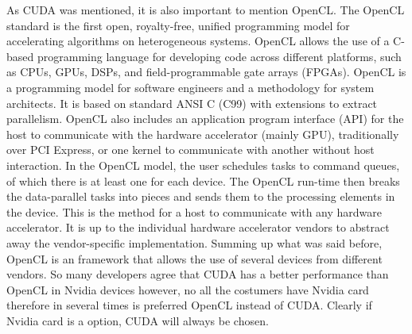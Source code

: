 \documentclass[Ingles]{ic-tese-v1}
\begin{document}
As CUDA was mentioned, it is also important to mention OpenCL. The OpenCL standard is the first open, royalty-free, unified programming model for accelerating algorithms on heterogeneous systems. OpenCL allows the use of a C-based programming language for developing code across different platforms, such as CPUs, GPUs, DSPs, and field-programmable gate arrays (FPGAs).
OpenCL is a programming model for software engineers and a methodology for system architects. It is based on standard ANSI C (C99) with extensions to extract parallelism. OpenCL also includes an application program interface (API) for the host to communicate with the hardware accelerator (mainly GPU), traditionally over PCI Express, or one kernel to communicate with another without host interaction.
In the OpenCL model, the user schedules tasks to command queues, of which there is at least one for each device. The OpenCL run-time then breaks the data-parallel tasks into pieces and sends them to the processing elements in the device. This is the method for a host to communicate with any hardware accelerator. It is up to the individual hardware accelerator vendors to abstract away the vendor-specific implementation.
Summing up what was said before, OpenCL is an framework that allows the use of several devices from different vendors. So many developers agree that CUDA has a better performance than OpenCL in Nvidia devices however, no all the costumers have Nvidia card therefore in several times is preferred OpenCL instead of CUDA. Clearly if Nvidia card is a option, CUDA will always be chosen.
\end{document}
